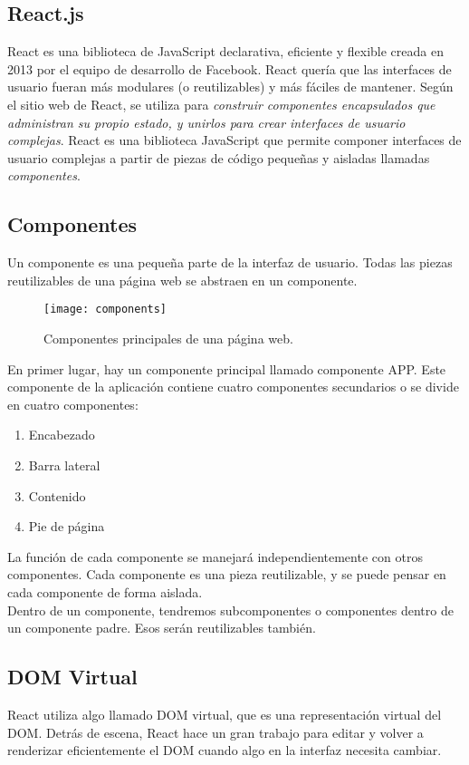 \subsection{React.js}
React es una biblioteca de JavaScript declarativa, eficiente y flexible creada en 2013 por el equipo de desarrollo de Facebook. React quería que las interfaces de usuario fueran más modulares (o reutilizables) y más fáciles de mantener. Según el sitio web de React, se utiliza para \textit{construir componentes encapsulados que administran su propio estado, y unirlos para crear interfaces de usuario complejas}. React es una biblioteca JavaScript que permite componer interfaces de usuario complejas a partir de piezas de código pequeñas y aisladas llamadas \textit{componentes}.
\subsection{Componentes}
Un componente es una pequeña parte de la interfaz de usuario. Todas las piezas reutilizables de una página web se abstraen en un componente.
\begin{figure}[H]
  \centering
  \texttt{[image: components]}
  \caption{Componentes principales de una página web.}
\end{figure}
En primer lugar, hay un componente principal llamado componente APP. Este componente de la aplicación contiene cuatro componentes secundarios o se divide en cuatro componentes:
\begin{enumerate}
  \item Encabezado
  \item Barra lateral
  \item Contenido
  \item Pie de página
\end{enumerate}
La función de cada componente se manejará independientemente con otros componentes. Cada componente es una pieza reutilizable, y se puede pensar en cada componente de forma aislada. \\[0.8cm]
Dentro de un componente, tendremos subcomponentes o componentes dentro de un componente padre. Esos serán reutilizables también.
\subsection{DOM Virtual}
React utiliza algo llamado DOM virtual, que es una representación virtual del DOM. Detrás de escena, React hace un gran trabajo para editar y volver a renderizar eficientemente el DOM cuando algo en la interfaz necesita cambiar.